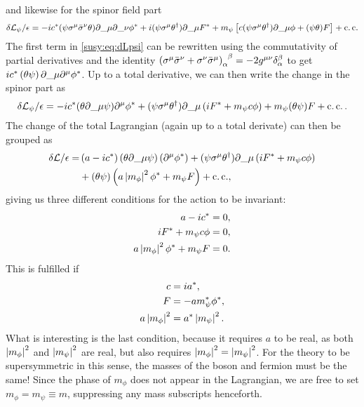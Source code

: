 \documentclass[../main.tex]{subfiles}
\begin{document}
and likewise for the spinor field part
\begin{equation}
  \label{susy:eq:dLpsi}
  \delta\L_\psi/\epsilon = -i c^\ast (\psi \sigma\^{\mu}\bar{\sigma}\^{\nu}\theta) \partial\_{\mu}\partial\_{\nu} \phi^\ast + i (\psi \sigma\^{\mu} \theta^\dagger) \partial\_{\mu} F^\ast + m_\psi \bclosed{c (\psi\sigma\^{\mu}\theta^\dagger) \partial\_{\mu} \phi + (\psi\theta) F} + \cc
\end{equation}
The first term in \cref{susy:eq:dLpsi} can be rewritten using the commutativity of partial derivatives and the identity \(\tensor{\pclosed{\sigma\^{\mu} \bar{\sigma}\^{\nu} + \sigma\^{\nu} \bar{\sigma}\^{\mu}}}{_\alpha^\beta} = -2\tensor{g}{^\mu^\nu} \tensor*{\delta}{_\alpha^\beta}\) to get \(i c^\ast \pclosed{\theta \psi} \partial\_{\mu}\partial\^{\mu} \phi^\ast\).
Up to a total derivative, we can then write the change in the spinor part as
\begin{equation}
  \delta\L_\psi/\epsilon = -i c^\ast (\theta\partial\_{\mu}\psi)\partial\^{\mu} \phi^\ast + (\psi \sigma\^{\mu} \theta^\dagger) \partial\_{\mu} \pclosed{i F^\ast + m_\psi c \phi} + m_\psi (\theta\psi) F + \cc.
\end{equation}
The change of the total Lagrangian (again up to a total derivate) can then be grouped as
\begin{align}
  \nonumber
  \delta\L/\epsilon = & \pclosed{a-ic^\ast} (\theta\partial\_{\mu}\psi) \pclosed{\partial\^{\mu} \phi^\ast}
  + (\psi \sigma\^{\mu} \theta^\dagger) \partial\_{\mu} \pclosed{i F^\ast + m_\psi c \phi}                  \\
                      & + (\theta\psi) \pclosed{a\abs{m_\phi}^2\phi^\ast + m_\psi F} + \cc,
\end{align}
giving us three different conditions for the action to be invariant:
\begin{subequations}
  \begin{align}
    a - ic^\ast                          & = 0, \\
    i F^\ast + m_\psi c \phi             & = 0, \\
    a\left|m_\phi\right|^2 \phi^\ast + m_\psi F & = 0.
  \end{align}
\end{subequations}
This is fulfilled if
\begin{subequations}
  \label{susy:eq:susy_transformation_requirements}
  \begin{align}
    c               & = i a^\ast,                 \\
    F               & = -a m_\psi^\ast \phi^\ast, \\
    a\left|m_\phi\right|^2 & = a^\ast \left|m_\psi\right|^2.
  \end{align}
\end{subequations}
What is interesting is the last condition, because it requires \(a\) to be real, as both \(\left|m_\phi\right|^2\) and \(\left|m_\psi\right|^2\) are real, but also requires \(\left|m_\phi\right|^2 = \left|m_\psi\right|^2\).
For the theory to be supersymmetric in this sense, the masses of the boson and fermion must be the same!
Since the phase of \(m_\phi\) does not appear in the Lagrangian, we are free to set \(m_\phi = m_\psi \equiv m\), suppressing any mass subscripts henceforth.
\end{document}
